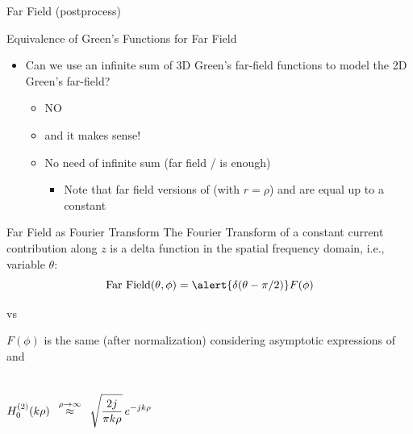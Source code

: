 \begin{frame}[allowframebreaks]{Far Field (postprocess)}

  \begin{block}{Equivalence of Green's Functions for Far Field}
    \begin{itemize}
    \item Can we use an infinite sum of 3D Green's far-field functions
      to model the 2D Green's far-field?
      \begin{itemize}
      \item NO
      \item and it makes sense!
      \item No need of infinite sum (\alert{far field {\GreenT}/{\GreenD} is enough})
        \begin{itemize}
        \item Note that far field versions of {\GreenT} (with
          $r=\rho$) and {\GreenD} are equal up to a constant
        \end{itemize}

      \end{itemize}
    \end{itemize}
  \end{block}
    

  \begin{block}{Far Field as Fourier Transform} 
      The Fourier Transform of a constant current contribution along
      $z$ is a delta function in the spatial frequency domain, i.e.,
      variable $\theta$:
      \begin{equation}
        \text{Far Field}(\theta,\phi) =  \alert{\delta(\theta-\pi/2)}  F(\phi)
      \end{equation}
      
    \end{block}
  
    \framebreak %
    
    \begin{block}{{\GreenD} vs {\GreenT}}

      
      $F(\phi)$ is the same (after normalization) considering asymptotic
      expressions of {\GreenT} and {\GreenT}
      
    \begin{columns}\centering
      \begin{equation*}
        H_0^{(2)}(k\rho)
        \enskip \overset{\rho\rightarrow\infty}{\approx} \enskip
        \sqrt{\dfrac{2 j }{\pi k \rho}} \, e^{-jk\rho}
      \end{equation*}


\end{columns}
\end{block}
\end{frame}
